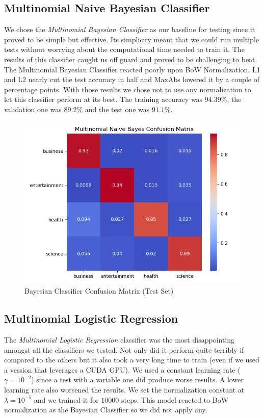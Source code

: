 \documentclass[10pt,a4paper]{report}
\begin{document}
\subsection{Multinomial Naive Bayesian Classifier}
We chose the \textit{Multinomial Bayesian Classifier} as our baseline for testing since it proved to be simple but effective. Its simplicity meant that we could run multiple tests without worrying about the computational time needed to train it. The results of this classifier caught us off guard and proved to be challenging to beat. The Multinomial Bayesian Classifier reacted poorly upon BoW Normalization. L1 and L2 nearly cut the test accuracy in half and MaxAbs lowered it by a couple of percentage points. With those results we chose not to use any normalization to let this classifier perform at its best. The training accuracy was $94.39 \%$, the validation one was $89.2 \%$ and the test one was $91.1 \%$.
\begin{figure}[!ht]
\centering
\includegraphics[width=0.5\linewidth]{bayes_confmat.png}
\caption{Bayesian Classifier Confusion Matrix (Test Set)}
\label{fig:bayes_confmat}
\end{figure}
\subsection{Multinomial Logistic Regression}
The \textit{Multinomial Logistic Regression} classifier was the most disappointing amongst all the classifiers we tested. Not only did it perform quite terribly if compared to the others but it also took a very long time to train (even if we used a version that leverages a CUDA GPU). We used a constant learning rate ($\gamma=10^{-2}$) since a test with a variable one did produce worse results. A lower learning rate also worsened the results. We set the normalization constant at $\lambda=10^{-5}$ and we trained it for $10000$ steps. This model reacted to BoW normalization as the Bayesian Classifier so we did not apply any. 
\end{document}
